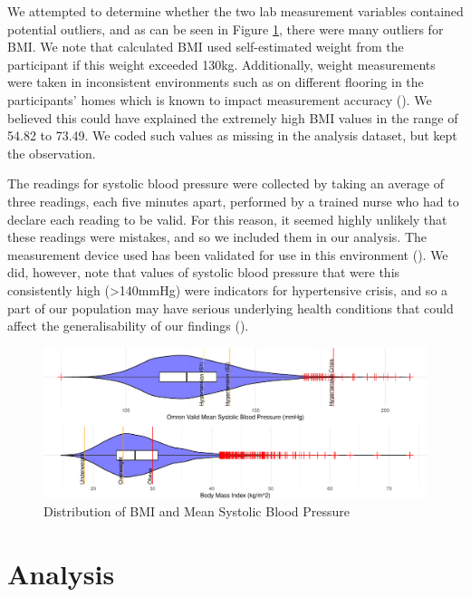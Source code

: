 \documentclass[
  11pt,
  twocolumn]{article}
\begin{document}
We attempted to determine whether the two lab measurement variables
contained potential outliers, and as can be seen in Figure
\ref{fig:output-distribution-plots}, there were many outliers for BMI.
We note that calculated BMI used self-estimated weight from the
participant if this weight exceeded 130kg. Additionally, weight
measurements were taken in inconsistent environments such as on
different flooring in the participants' homes which is known to impact
measurement accuracy (). We
believed this could have explained the extremely high BMI values in the
range of 54.82 to 73.49. We coded such values as missing in the analysis
dataset, but kept the observation.

The readings for systolic blood pressure were collected by taking an
average of three readings, each five minutes apart, performed by a
trained nurse who had to declare each reading to be valid. For this
reason, it seemed highly unlikely that these readings were mistakes, and
so we included them in our analysis. The measurement device used has
been validated for use in this environment (). We did, however, note that values of systolic blood
pressure that were this consistently high (\textgreater140mmHg) were
indicators for hypertensive crisis, and so a part of our population may
have serious underlying health conditions that could affect the
generalisability of our findings ().

\begin{figure}[H]
\includegraphics{Coursework_files/figure-latex/output-distribution-plots-1} \caption{Distribution of BMI and Mean Systolic Blood Pressure}\label{fig:output-distribution-plots}
\end{figure}

\section{Analysis}\label{analysis}
\end{document}
